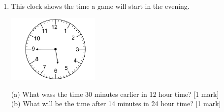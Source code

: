 \documentclass{article}
\begin{document}
\begin{enumerate}
\hline
\vspace{5pt}

\\


\item \quad This clock shows the time a game will start in the evening.
\begin{center}
    \includegraphics[width=4.5cm]{Year_6_Mixed_Tests/Clock2.png}
\end{center}
\begin{flushleft}
(a) What wass the time 30 minutes earlier in 12 hour time? \hspace{2cm} [1 mark] \\
\vspace{20pt}
(b) What will be the time after 14 minutes in 24 hour time? \hspace{2cm} [1 mark]
\vspace{20pt}
\end{flushleft}

 

\end{enumerate}
\end{document}
